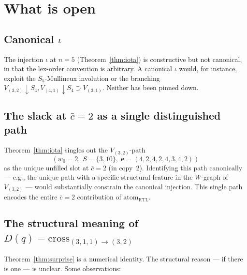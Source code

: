 \documentclass[11pt]{article}
\theoremstyle{definition}
\begin{document}
\section{What is open}\label{sec:open}

\subsection*{Canonical $\iota$}

The injection $\iota$ at $n=5$ (Theorem~\ref{thm:iota}) is constructive but not canonical, in that the lex-order convention is arbitrary. A canonical $\iota$ would, for instance, exploit the $S_5$-Mullineux involution or the branching $V_{(3,2)} \downarrow S_4, V_{(4,1)} \downarrow S_4 \supset V_{(3,1)}$. Neither has been pinned down.

\subsection*{The slack at $\bar c = 2$ as a single distinguished path}

Theorem~\ref{thm:iota} singles out the $V_{(3,2)}$-path
\[
(w_0 = 2,\; S = \{3, 10\},\; \mathbf{e} = (4,2,4,2,4,3,4,2))
\]
as the unique unfilled slot at $\bar c = 2$ (in copy~2). Identifying this path canonically --- e.g., the unique path with a specific structural feature in the $W$-graph of $V_{(3,2)}$ --- would substantially constrain the canonical injection. This single path encodes the entire $\bar c = 2$ contribution of $\mathrm{atom}_{\mathrm{RTL}}$.

\subsection*{The structural meaning of $D(q) = \mathrm{cross}_{(3,1,1)\to(3,2)}$}

Theorem~\ref{thm:surprise} is a numerical identity. The structural reason --- if there is one --- is unclear. Some observations:
\end{document}
